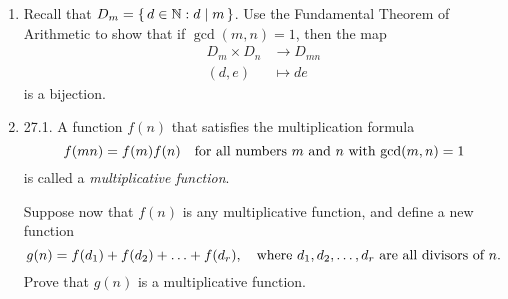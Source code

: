 \documentclass[10pt]{article}
\begin{document}
\begin{enumerate}[itemsep=1em,label=\Alph*.,leftmargin=*]
    \pagebreak
    \item Recall that $D_m = \set{d \in \ensuremath{\mathbb{N}}: d \mid m }$. Use the Fundamental Theorem of Arithmetic to show that if $\gcd(m,n)=1$, then the map
        \begin{align*}
            D_m \times D_n &\rightarrow D_{mn}
            \\(d,e) &\mapsto de
        \end{align*}
is a bijection.




\pagebreak
\item 27.1. A function $f(n)$ that satisfies the multiplication formula
    \[f(mn)=f(m)f(n) \quad \textnormal{for all numbers $m$ and $n$ with $\gcd(m,n)=1$}\]
        is called a \textit{multiplicative function}. 

        Suppose now that $f(n)$ is any multiplicative function, and define a new function 
        \[g(n)=f(d_1)+f(d_2)+\ldots+f(d_r), \quad \textnormal{where $d_1,d_2,\ldots,d_r$ are all divisors of $n$}.\]
        Prove that $g(n)$ is a multiplicative function.


\end{enumerate}
\end{document}
